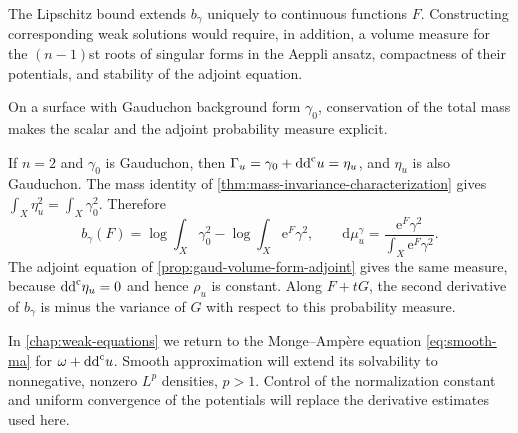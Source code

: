 The Lipschitz bound extends $b_\gamma$ uniquely to continuous functions $F$. Constructing corresponding weak solutions would require, in addition, a volume measure for the $(n-1)$st roots of singular forms in the Aeppli ansatz, compactness of their potentials, and stability of the adjoint equation.

On a surface with Gauduchon background form $\gamma_0$, conservation of the total mass makes the scalar and the adjoint probability measure explicit.

\begin{example}\label{ex:gaud-volume-surface}
If $n=2$ and $\gamma_0$ is Gauduchon, then $\Gamma_u=\gamma_0+\mathrm{dd}^{\mathrm{c}} u=\eta_u$, and $\eta_u$ is also Gauduchon. The mass identity of \cref{thm:mass-invariance-characterization} gives $\int_X\eta_u^2=\int_X\gamma_0^2$. Therefore
\[
 b_\gamma(F)=\log\int_X\gamma_0^2-
                   \log\int_X\mathrm{e}^F\gamma^2,
 \qquad
 \mathrm{d}\mu_u^\gamma=\frac{\mathrm{e}^F\gamma^2}{\int_X\mathrm{e}^F\gamma^2}.
\]
The adjoint equation of \cref{prop:gaud-volume-form-adjoint} gives the same measure, because $\mathrm{dd}^{\mathrm{c}}\eta_u=0$ and hence $\rho_u$ is constant. Along $F+tG$, the second derivative of $b_\gamma$ is minus the variance of $G$ with respect to this probability measure.
\end{example}

In \cref{chap:weak-equations} we return to the Monge--Amp\`ere equation \eqref{eq:smooth-ma} for $\omega+\mathrm{dd}^{\mathrm{c}} u$. Smooth approximation will extend its solvability to nonnegative, nonzero $L^p$ densities, $p>1$. Control of the normalization constant and uniform convergence of the potentials will replace the derivative estimates used here.
